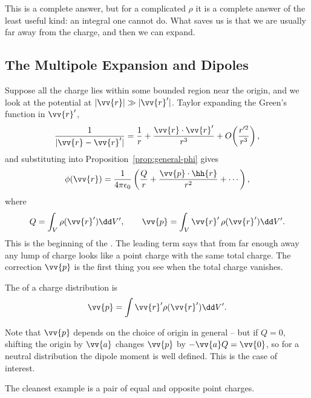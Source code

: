 This is a complete answer, but for a complicated $\rho$ it is a complete answer of the least useful kind: an integral one cannot do. What saves us is that we are usually far away from the charge, and then we can expand.

\subsection{The Multipole Expansion and Dipoles}

Suppose all the charge lies within some bounded region near the origin, and we look at the potential at $|\vv{r}| \gg |\vv{r}'|$. Taylor expanding the Green's function in $\vv{r}'$,
$$
\frac{1}{|\vv{r}-\vv{r}'|} = \frac{1}{r} + \frac{\vv{r}\cdot \vv{r}'}{r^3} + O\!\left(\frac{r'^2}{r^3}\right),
$$
and substituting into Proposition~\ref{prop:general-phi} gives
$$
\phi(\vv{r}) = \frac{1}{4\pi \epsilon_0}\left(\frac{Q}{r} + \frac{\vv{p}\cdot \hh{r}}{r^2} + \cdots\right),
$$
where
$$
Q = \int_V \rho(\vv{r}')\dd V', \qquad \vv{p} = \int_V \vv{r}'\, \rho(\vv{r}')\dd V'.
$$
This is the beginning of the . The leading term says that from far enough away any lump of charge looks like a point charge with the same total charge. The correction $\vv{p}$ is the first thing you see when the total charge vanishes.

\begin{definition}
	The  of a charge distribution is
	$$
	\vv{p} = \int \vv{r}'\rho(\vv{r}')\dd V'.
	$$
\end{definition}

Note that $\vv{p}$ depends on the choice of origin in general -- but if $Q = 0$, shifting the origin by $\vv{a}$ changes $\vv{p}$ by $-\vv{a}Q = \vv{0}$, so for a neutral distribution the dipole moment is well defined. This is the case of interest.

The cleanest example is a pair of equal and opposite point charges.

